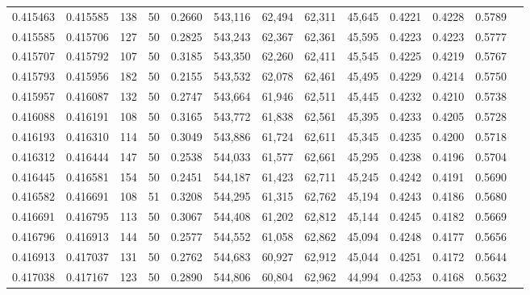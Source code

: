 \begin{tabular}{rrrrrrrrrrrrr}
0.415463 & 0.415585 &   138 &  50 &                                     0.2660 & 543,116 &  62,494 &  62,311 &  45,645 & 0.4221 & 0.4228 & 0.5789 \\
0.415585 & 0.415706 &   127 &  50 &                                     0.2825 & 543,243 &  62,367 &  62,361 &  45,595 & 0.4223 & 0.4223 & 0.5777 \\
0.415707 & 0.415792 &   107 &  50 &                                     0.3185 & 543,350 &  62,260 &  62,411 &  45,545 & 0.4225 & 0.4219 & 0.5767 \\
0.415793 & 0.415956 &   182 &  50 &                                     0.2155 & 543,532 &  62,078 &  62,461 &  45,495 & 0.4229 & 0.4214 & 0.5750 \\
0.415957 & 0.416087 &   132 &  50 &                                     0.2747 & 543,664 &  61,946 &  62,511 &  45,445 & 0.4232 & 0.4210 & 0.5738 \\
0.416088 & 0.416191 &   108 &  50 &                                     0.3165 & 543,772 &  61,838 &  62,561 &  45,395 & 0.4233 & 0.4205 & 0.5728 \\
0.416193 & 0.416310 &   114 &  50 &                                     0.3049 & 543,886 &  61,724 &  62,611 &  45,345 & 0.4235 & 0.4200 & 0.5718 \\
0.416312 & 0.416444 &   147 &  50 &                                     0.2538 & 544,033 &  61,577 &  62,661 &  45,295 & 0.4238 & 0.4196 & 0.5704 \\
0.416445 & 0.416581 &   154 &  50 &                                     0.2451 & 544,187 &  61,423 &  62,711 &  45,245 & 0.4242 & 0.4191 & 0.5690 \\
0.416582 & 0.416691 &   108 &  51 &                                     0.3208 & 544,295 &  61,315 &  62,762 &  45,194 & 0.4243 & 0.4186 & 0.5680 \\
0.416691 & 0.416795 &   113 &  50 &                                     0.3067 & 544,408 &  61,202 &  62,812 &  45,144 & 0.4245 & 0.4182 & 0.5669 \\
0.416796 & 0.416913 &   144 &  50 &                                     0.2577 & 544,552 &  61,058 &  62,862 &  45,094 & 0.4248 & 0.4177 & 0.5656 \\
0.416913 & 0.417037 &   131 &  50 &                                     0.2762 & 544,683 &  60,927 &  62,912 &  45,044 & 0.4251 & 0.4172 & 0.5644 \\
0.417038 & 0.417167 &   123 &  50 &                                     0.2890 & 544,806 &  60,804 &  62,962 &  44,994 & 0.4253 & 0.4168 & 0.5632 \\

\end{tabular}
